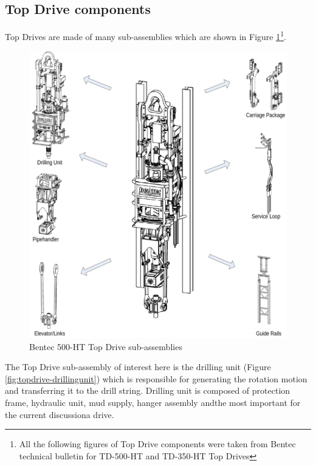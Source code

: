\subsection{Top Drive components}%
\label{sub:top_drive_components}

Top Drives are made of many sub-assemblies which are shown in Figure \ref{fig:topdrive-subassemblies}\footnote{All the following figures of Top Drive components were taken from Bentec technical bulletin for TD-500-HT and TD-350-HT Top Drives}.

\begin{figure}[H]
	\centering
	\includegraphics[width=\linewidth]{figures/topdrive_subassemblies.png}
	\caption{Bentec 500-HT Top Drive sub-assemblies}%
	\label{fig:topdrive-subassemblies}
\end{figure}

The Top Drive sub-assembly of interest here is the drilling unit (Figure \ref{fig:topdrive-drillingunit}) which is responsible for generating the rotation motion and transferring it to the drill string. Drilling unit is composed of protection frame, hydraulic unit, mud supply, hanger assembly and\textemdash the most important for the current discussion\textemdash a drive.

